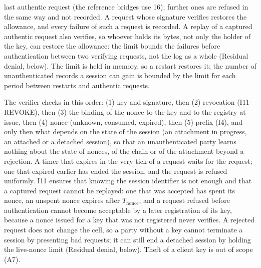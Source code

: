 \begin{invariant}
\begin{enumerate}[leftmargin=2em,label=(\alph*)]
last authentic request (the reference bridges use 16); further ones are
refused in the same way and not recorded. A request whose signature
verifies restores the allowance, and every failure of such a request is
recorded. A replay of a captured authentic request also verifies, so
whoever holds its bytes, not only the holder of the key, can restore the
allowance: the limit bounds the failures before authentication between two
verifying requests, not the log as a whole (Residual denial, below). The limit is held in
memory, so a restart restores it; the number of unauthenticated records
a session can gain is bounded by the limit for each period between
restarts and authentic requests.
\end{enumerate}
\end{invariant}

The verifier checks in this order: (1) key and signature, then
(2) revocation (I11-REVOKE), then (3) the binding of the nonce to the key
and to the registry at issue, then (4) nonce (unknown, consumed,
expired), then (5) prefix (I4), and only then what depends on the state of
the session (an attachment in progress, an attached or a detached session),
so that an
unauthenticated party learns nothing about the state of nonces, of the
chain or of the attachment beyond a rejection. A timer that expires in the
very tick of a request waits for the request; one that expired earlier has
ended the session, and the request is refused uniformly. I11 ensures that knowing the session
identifier is not enough and that a captured request cannot be replayed:
one that was accepted has spent its nonce, an unspent nonce expires after
$T_{\text{nonce}}$, and a request refused before authentication cannot
become acceptable by a later registration of its key, because a nonce
issued for a key that was not registered never verifies. A rejected request does not change the cell, so a
party without a key cannot terminate a session by presenting bad requests;
it can still end a detached session by holding the live-nonce limit
(Residual denial, below). Theft of a client key is out of scope (A7).


